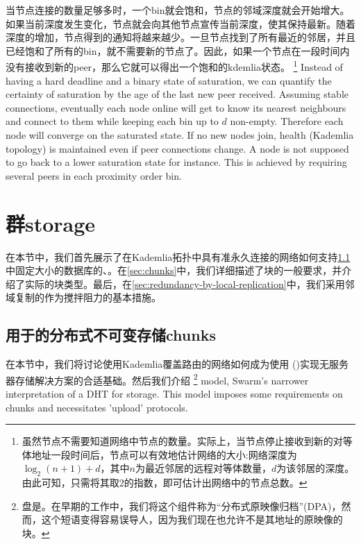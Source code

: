 当节点连接的数量足够多时，一个bin就会饱和，节点的邻域深度就会开始增大。如果当前深度发生变化，节点就会向其他节点宣传当前深度，使其保持最新。随着深度的增加，节点得到的通知将越来越少。一旦节点找到了所有最近的邻居，并且已经饱和了所有的bin，就不需要新的节点了。因此，如果一个节点在一段时间内没有接收到新的peer，那么它就可以得出一个饱和的kdemlia状态。%
%
\footnote{虽然节点不需要知道网络中节点的数量。实际上，当节点停止接收到新的对等体地址一段时间后，节点可以有效地估计网络的大小:网络深度为$\log_2(n+1)+ d$，其中$n$为最近邻居的远程对等体数量，$d$为该邻居的深度。由此可知，只需将其取2的指数，即可估计出网络中的节点总数。}
%
Instead of having a hard deadline and a binary state of saturation, we can quantify the certainty of saturation by the age of the last new peer received. Assuming stable connections, eventually each node online will get to know its nearest neighbours and connect to them while keeping each bin up to $d$ non-empty. Therefore each node will converge on the saturated state. If no new nodes join, health (Kademlia topology) is maintained even if peer connections change. A node is not supposed to go back to a lower saturation state for instance. This is achieved by requiring several peers in each proximity order bin. 

\section{群storage\statusgreen}\label{sec:kademlia-storage}

在本节中，我们首先展示了在Kademlia拓扑中具有准永久连接的网络如何支持\ref{sec:disc}中固定大小的数据库的、。在\ref{sec:chunks}中，我们详细描述了块的一般要求，并介绍了实际的块类型。最后，在\ref{sec:redundancy-by-local-replication}中，我们采用邻域复制的作为搅拌阻力的基本措施。

\subsection{用于的分布式不可变存储chunks\statusgreen}\label{sec:disc}
 
在本节中，我们将讨论使用Kademlia覆盖路由的网络如何成为使用 ()实现无服务器存储解决方案的合适基础。然后我们介绍%
%
\footnote{盘是。在早期的工作中，我们将这个组件称为“分布式原映像归档”(DPA)，然而，这个短语变得容易误导人，因为我们现在也允许不是其地址的原映像的块。}
% 
model, Swarm's narrower interpretation of a DHT for storage. This model 
imposes some requirements on chunks and necessitates 'upload' protocols. 

